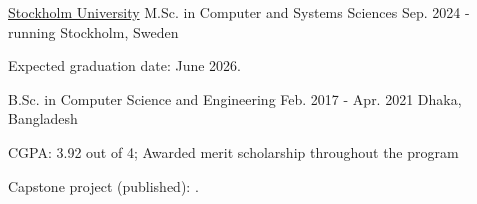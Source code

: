 

\begin{cventries}

  \cventry
    {\href{https://www.su.se/department-of-computer-and-systems-sciences/}{Stockholm University}} %
    {M.Sc. in Computer and Systems Sciences} %
    {Sep. 2024 - running} %
    {Stockholm, Sweden} %
    {
      \begin{cvitems} %
        \item {Expected graduation date: June 2026.}
      \end{cvitems}
    }

  \cventry
    {} %
    {B.Sc. in Computer Science and Engineering} %
    {Feb. 2017 - Apr. 2021} %
    {Dhaka, Bangladesh} %
    {
      \begin{cvitems} %
        \item {CGPA: 3.92 out of 4; Awarded merit scholarship throughout the program}
        \item {
        Capstone project (published): {}
        .}
      \end{cvitems}
    }

\end{cventries}
